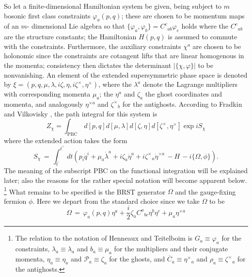 \documentclass[a4paper,10pt]{article}
\begin{document}
So let a finite-dimensional Hamiltonian system be given, being subject to $m$ bosonic 
first class constraints $\varphi_a(p,q)$; these are chosen to be momentum maps of an $m$-
dimensional Lie algebra \cite{Wood 92} so that 
$\{\varphi_a,\varphi_b\}=C^c{}_{ab}\varphi_c$ holds where the $C^c{}_{ab}$ are the 
structure constants; the Hamiltonian $H(p,q)$ is assumed to commute with the constraints. 
Furthermore, the auxiliary constraints $\chi^a$ are chosen to be holonomic since the 
constraints are cotangent lifts that are linear homogenous in the momenta; consistency 
then dictates the determinant $|\{\chi,\varphi\}|$ to be nonvanishing. An element of the 
extended supersymmetric phase space is denoted by 
$\xi=(p,q,\mu,\lambda,i\zeta,\eta,i\zeta^{\times},\eta^{\times})$, where the $\lambda^a$ 
denote the Lagrange multipliers with corresponding momenta $\mu_a$; the $\eta^a$ and 
$\zeta_a$ the ghost coordinates and momenta, and analogously $\eta^{\times a}$ and 
$\zeta^{\times}{\!}_b$ for the antighosts. According to Fradkin and Vilkovisky \cite{Frad 
75}, the path integral for this system is
\begin{equation}\label{functionalintegralfv}
Z_{\chi}=\int_{\mathrm{PBC}}\,d[p,q]d[\mu,\lambda]d[\zeta,\eta]
d[\zeta^{\times},\eta^{\times}]
\exp iS_{\chi}
\end{equation}
where the extended action takes the form
\begin{equation}\label{actionfv}
S_{\chi}\,=\,\int_{t^{\prime}}^{t^{\prime\prime}}\,dt\left(p_i\dot{q}^i+\mu_a
\dot{\lambda}^a+i\zeta_a\dot{\eta}^a+i\zeta^
{\times}{\!}_a\dot{\eta}^{\times a}\,-H\,-i\{\Omega,\phi\}\right).
\end{equation}
The meaning of the subscript PBC on the functional integration will be explained later; 
also the reasons for the rather special notation will become apparent below. 
\footnote{The relation to the notation of Henneaux and Teitelboim \cite{Henn 92} is 
$G_a\equiv\varphi_a$ for the constraints, $\lambda_a\equiv\lambda_a$  and 
$b_a\equiv\mu_a$ for the multipliers and their conjugate momenta, $\eta_a\equiv\eta_a$ 
and $\mathcal{P}_a\equiv\zeta_a$ for the ghosts, and 
$\overline{C}_a\equiv\eta^{\times}{}_a$ and $\rho_a\equiv\zeta^{\times}{}_a$ for the 
antighosts.} 
What remains to be specified is the BRST generator $\Omega$ and the gauge-fixing fermion 
$\phi$. Here we depart from the standard choice since we take $\Omega$ to be
\begin{equation}\label{brsqcorrected}
\Omega\,=\,\varphi_a(p,q)\eta^a+\frac{i}{2}\zeta_aC^a{}_{bc}\eta^b\eta^c+\mu_a
\eta^{\times a}
\end{equation}
\end{document}
